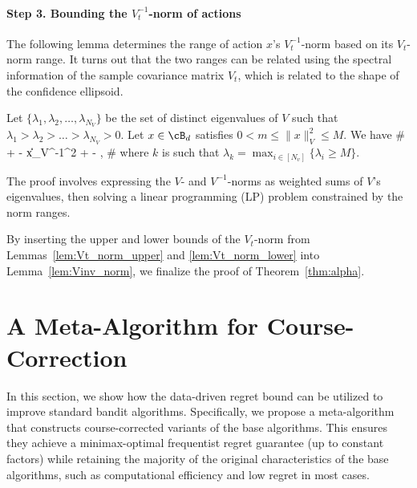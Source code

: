 \paragraph{Step 3. Bounding the $V_t^{-1}$-norm of actions}


The following lemma determines the range of action $x$'s $V_t^{-1}$-norm based on its $V_t$-norm range. It turns out that the two ranges can be related using the spectral information of the sample covariance matrix $V_t$, which is related to the shape of the confidence ellipsoid.


\begin{lemma}
\label{lem:Vinv_norm}
Let $\{\lambda_1,\lambda_2,\dots, \lambda_{N_V}\}$ be the set of distinct eigenvalues of $V$ such that $\lambda_1>\lambda_2>\dots> \lambda_{N_V}>0$. Let $x\in \cB_d$ satisfies
	$
	0< m \leq \|x\|_{V}^2 \leq M
	$. We have
	\#
	 +    -  \leq \|x\|_{V^{-1}}^2  \leq  {} +    - ,
	\#
	where $k$ is such that $\lambda_{k} = \max_{i \in[N_v]} \{\lambda_i  \geq M\}$.
\end{lemma}

The proof involves expressing the $V$- and $V^{-1}$-norms as weighted sums of $V$'s eigenvalues, then solving a linear programming (LP) problem constrained by the norm ranges.




By inserting the upper and lower bounds of the $V_t$-norm from Lemmas~\ref{lem:Vt_norm_upper} and \ref{lem:Vt_norm_lower} into Lemma~\ref{lem:Vinv_norm}, we finalize the proof of Theorem~\ref{thm:alpha}.






\section{A Meta-Algorithm for Course-Correction}
\label{sec:meta}


In this section, we show how the data-driven regret bound can be utilized to improve standard bandit algorithms. Specifically, we propose a meta-algorithm that constructs course-corrected variants of the base algorithms. This ensures they achieve a minimax-optimal frequentist regret guarantee (up to constant factors) while retaining the majority of the original characteristics of the base algorithms, such as computational efficiency and low regret in most cases.


